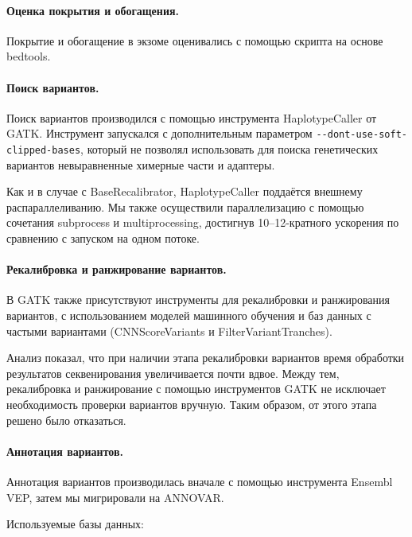 \documentclass[a4paper,12pt]{article}
\begin{document}
\paragraph{Оценка покрытия и обогащения.}
Покрытие и обогащение в экзоме оценивались с помощью скрипта на основе bedtools\cite{Quinlan_2010}.

\paragraph{Поиск вариантов.}
Поиск вариантов производился с помощью инструмента HaplotypeCaller от GATK.
Инструмент запускался с дополнительным параметром \verb|--dont-use-soft-clipped-bases|, который не позволял использовать для поиска генетических вариантов невыравненные химерные части и адаптеры.

Как и в случае с BaseRecalibrator, HaplotypeCaller поддаётся внешнему распараллеливанию\cite{Heldenbrand_2019}.
Мы также осуществили параллелизацию с помощью сочетания subprocess и multiprocessing, достигнув 10--12-кратного ускорения по сравнению с запуском на одном потоке.

\paragraph{Рекалибровка и ранжирование вариантов.}
В GATK также присутствуют инструменты для рекалибровки и ранжирования вариантов, с использованием моделей машинного обучения и баз данных с частыми вариантами (CNNScoreVariants и FilterVariantTranches).

Анализ показал, что при наличии этапа рекалибровки вариантов время обработки результатов секвенирования увеличивается почти вдвое.
Между тем, рекалибровка и ранжирование с помощью инструментов GATK не исключает необходимость проверки вариантов вручную.
Таким образом, от этого этапа решено было отказаться.

\paragraph{Аннотация вариантов.}
Аннотация вариантов производилась вначале с помощью инструмента Ensembl VEP\cite{McLaren_2016}, затем мы мигрировали на ANNOVAR\cite{Wang_2010}.

Используемые базы данных:
\end{document}
